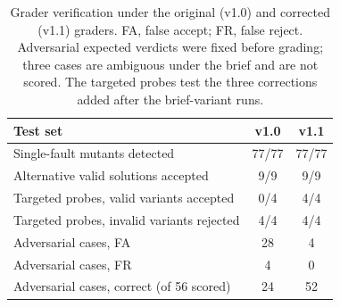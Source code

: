 \begin{table}[t]
\caption{Grader verification under the original (v1.0) and corrected (v1.1) graders. FA, false accept; FR, false reject. Adversarial expected verdicts were fixed before grading; three cases are ambiguous under the brief and are not scored. The targeted probes test the three corrections added after the brief-variant runs.}
\label{tab:grader}
\footnotesize
\setlength{\tabcolsep}{3.5pt}
\begin{tabular}{lcc}
\toprule
Test set & v1.0 & v1.1\\
\midrule
Single-fault mutants detected & 77/77 & 77/77\\
Alternative valid solutions accepted & 9/9 & 9/9\\
Targeted probes, valid variants accepted & 0/4 & 4/4\\
Targeted probes, invalid variants rejected & 4/4 & 4/4\\
Adversarial cases, FA & 28 & 4\\
Adversarial cases, FR & 4 & 0\\
Adversarial cases, correct (of 56 scored) & 24 & 52\\
\bottomrule
\end{tabular}
\end{table}
